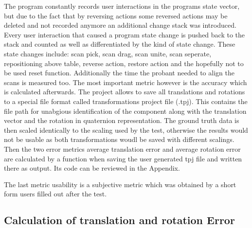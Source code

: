 \documentclass[hyperref,english,bachelorofscience,bibnum]{cgvpub}
\begin{document}
The program constantly records user interactions in the programs state vector, but due to the fact that by reversing actions some reversed actions may be deleted and not recorded anymore an additional change stack was introduced. Every user interaction that caused a program state change is pushed back to the stack and counted as well as differentiated by the kind of state change. These state changes include: scan pick, scan drag, scan unite, scan seperate, repositioning above table, reverse action, restore action and the hopefully not to be used reset function.
Additionally the time the probant needed to align the scans is measured too.
The most important metric however is the accuracy which is calculated afterwards. The project allows to save all translations and rotations to a special file format called transformations project file (.tpj). This contains the file path for unabgious identification of the component along with the translation vector and the rotation in quaternion representation. The ground truth data is then scaled identically to the scaling used by the test, otherwise the results would not be usable as both transformations woudl be saved with different scalings.
Then the two error metrics average translation error and average rotation error are calculated by a function when saving the user generated tpj file and written there as output. Its code can be reviewed in the Appendix.

The last metric usability is a subjective metric which was obtained by a short form users filled out after the test. 

\subsection{Calculation of translation and rotation Error}
\end{document}
